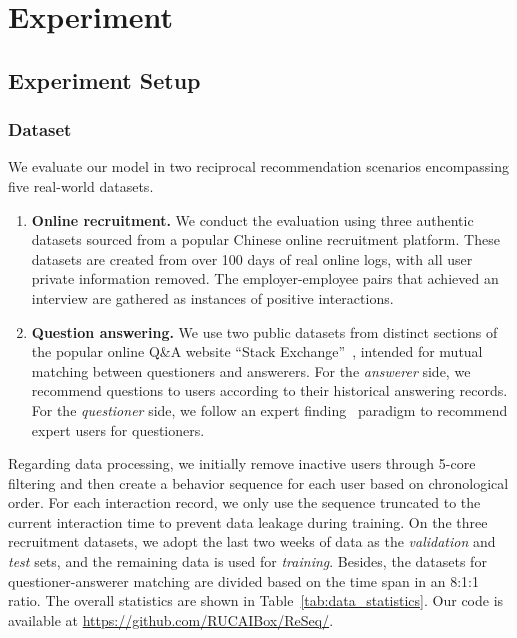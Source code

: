 \section{Experiment}

\subsection{Experiment Setup}
\subsubsection{Dataset}
We evaluate our model in two reciprocal recommendation scenarios encompassing five real-world datasets.
\begin{enumerate}
\item \textbf{Online recruitment.} We conduct the evaluation using three authentic datasets sourced from a popular Chinese online recruitment platform. These datasets are created from over 100 days of real online logs, with all user private information removed. 
The employer-employee pairs that achieved an interview are gathered as instances of positive interactions.
\item \textbf{Question answering.}
We use two public datasets from distinct sections of the popular online Q\&A website ``Stack Exchange''~\cite{paranjape2017motifs}, intended for mutual matching between questioners and answerers.
For the \textit{answerer} side, we recommend questions to users according to their historical answering records. For the \textit{questioner} side, we follow an expert finding~\cite{lin2017survey} paradigm to recommend expert users for questioners.
\end{enumerate}

Regarding data processing, we initially remove inactive users through 5-core filtering and then create a behavior sequence for each user based on chronological order. For each interaction record, we only use the sequence truncated to the current interaction time to prevent data leakage during training.
On the three recruitment datasets, we adopt the last two weeks of data as the \emph{validation} and \emph{test} sets, and the remaining data is used for \emph{training}. Besides, the datasets for questioner-answerer matching are divided based on the time span in an 8:1:1 ratio.
The overall statistics are shown in Table~\ref{tab:data_statistics}.
Our code is available at \textcolor{blue}{\url{https://github.com/RUCAIBox/ReSeq/}}.

